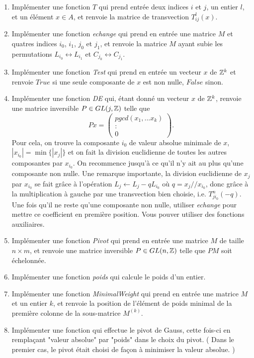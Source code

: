 \begin{enumerate}
\item Implémenter une fonction $T$ qui prend entrée deux indices $i$ et $j$, un entier $l$, et un élément $x\in A$, et renvoie la matrice de transvection $T_{ij}^l(x)$.
\item Implémenter une fonction \textit{echange} qui prend en entrée une matrice $M$ et quatres indices $i_0$, $i_1$, $j_0$ et $j_1$, et renvoie la matrice $M$ ayant subie les permutations $L_{i_0}\leftrightarrow L_{i_1}$ et $C_{j_0}\leftrightarrow C_{j_1}$.
\item Implémenter une fonction \textit{Test} qui prend en entrée un vecteur $x$ de $\mathbb Z^k$ et renvoie $True$ si une seule composante de $x$ est non nulle, $False$ sinon.
\item Implémenter une fonction \textit{DE} qui, étant donné un vecteur $x$ de $\mathbb Z^k$, renvoie une matrice inversible $P\in GL(j,\mathbb Z)$ telle que \[Px =\begin{pmatrix}pgcd(x_1,...x_k) \\  :\\ 0\end{pmatrix}.\] 
Pour cela, on trouve la composante $i_0$ de valeur absolue minimale de $x$, $|x_{i_0}|=\min \{|x_j|\}$ et on fait la division euclidienne de toutes les autres composantes par $x_{i_0}$. On recommence jusqu'à ce qu'il n'y ait au plus qu'une composante non nulle. Une remarque importante, la division euclidienne de $x_j$ par $x_{i_0}$ se fait grâce à l'opération $L_j\leftarrow L_j-qL_{i_0}$ où $q=x_j//x_{i_0}$, donc grâce à la multiplication à gauche par une transvection bien choisie, i.e. $T^n_{ji_0}(-q)$. Une fois qu'il ne reste qu'une composante non nulle, utiliser \textit{echange} pour mettre ce coefficient en première position. Vous pouver utiliser des fonctions auxiliaires.
\item Implémenter une fonction \textit{Pivot} qui prend en entrée une matrice $M$ de taille $n\times m$, et renvoie une matrice inversible $P\in GL(n,\mathbb Z)$ telle que $PM$ soit échelonnée.
\item Implémenter une fonction \textit{poids} qui calcule le poids d'un entier.
\item Implémenter une fonction \textit{MinimalWeight} qui prend en entrée une matrice $M$ et un entier $k$, et renvoie la position de l'élément de poids minimal de la première colonne de la sous-matrice $M^{(k)}$.
\item Implémenter une fonction qui effectue le pivot de Gauss, cette fois-ci en remplaçant "valeur absolue" par "poids" dans le choix du pivot. ( Dans le premier cas, le pivot était choisi de façon à minimiser la valeur absolue. )
\end{enumerate}

